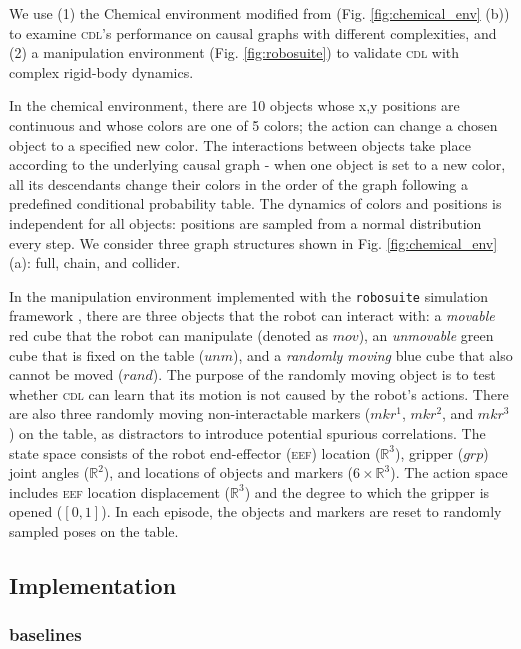 We use (1) the Chemical environment modified from \citet{ke2021systematic} (Fig. \ref{fig:chemical_env} (b)) to examine \textsc{cdl}'s performance on causal graphs with different complexities, and (2) a manipulation environment (Fig. \ref{fig:robosuite}) to validate \textsc{cdl} with complex rigid-body dynamics.

In the chemical environment, there are 10 objects whose x,y positions are continuous and whose colors are one of 5 colors; the action can change a chosen object to a specified new color. The interactions between objects take place according to the underlying causal graph - when one object is set to a new color, all its descendants change their colors in the order of the graph following a predefined conditional probability table. The dynamics of colors and positions is independent for all objects: positions are sampled from a normal distribution every step. We consider three graph structures shown in Fig. \ref{fig:chemical_env} (a): full, chain, and collider.

In the manipulation environment implemented with the \texttt{robosuite} simulation framework \cite{robosuite2020}, there are three objects that the robot can interact with: a \textit{movable} red cube that the robot can manipulate (denoted as $mov$), an \textit{unmovable} green cube that is fixed on the table ($unm$), and a \textit{randomly moving} blue cube that also cannot be moved ($rand$). The purpose of the randomly moving object is to test whether \textsc{cdl} can learn that its motion is not caused by the robot's actions. There are also three randomly moving non-interactable markers ($mkr^1$, $mkr^2$, and $mkr^3$) on the table, as distractors to introduce potential spurious correlations. The state space consists of the robot end-effector (\textsc{eef}) location ($\mathbb{R}^3$), gripper ($grp$) joint angles ($\mathbb{R}^2$), and locations of objects and markers ($6 \times \mathbb{R}^3$). The action space includes \textsc{eef} location displacement ($\mathbb{R}^3$) and the degree to which the gripper is opened ($[0, 1]$). In each episode, the objects and markers are reset to randomly sampled poses on the table.

\subsection{Implementation}

\subsubsection{baselines}


